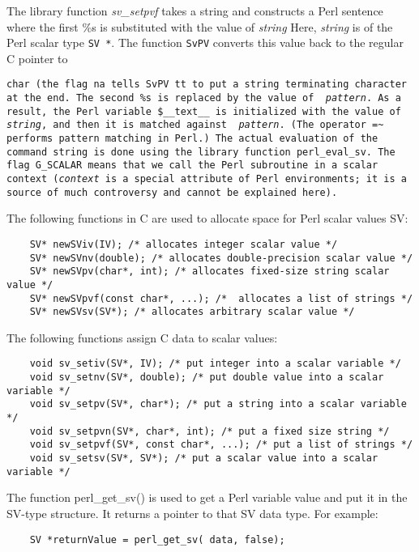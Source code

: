 \documentclass{article}
\begin{document}
The library function {\em sv\_setpvf\/} takes a string and constructs a
Perl sentence where the first \%s is substituted with the value of {\em
  string\/} Here, {\em string\/} is of the Perl scalar type \verb|SV *|.
The function {\tt SvPV} converts this value back to the regular C pointer
to {\tt char (the flag {\tt na} tells SvPV tt to put a string terminating
  character at the end. The second \%s is replaced by the value of {\em
    pattern}.  As a result, the Perl variable \$\_\_text\_\_ is initialized
  with the value of {\em string\/}, and then it is matched against {\em
    pattern}. (The operator \verb|=~| performs pattern matching in Perl.)
  The actual evaluation of the command string is done using the library
  function {\tt perl\_eval\_sv}.  The flag {G\_SCALAR} means that we call
  the Perl subroutine in a scalar context ({\em context\/} is a special
  attribute of Perl environments; it is a source of much controversy and
  cannot be explained here).


  
\noindent
The following functions in C are used to allocate space for Perl scalar
values SV:

\begin{verbatim}
    SV* newSViv(IV); /* allocates integer scalar value */
    SV* newSVnv(double); /* allocates double-precision scalar value */
    SV* newSVpv(char*, int); /* allocates fixed-size string scalar value */
    SV* newSVpvf(const char*, ...); /*  allocates a list of strings */
    SV* newSVsv(SV*); /* allocates arbitrary scalar value */
\end{verbatim}


\noindent
The following functions assign C data to scalar values:

\begin{verbatim}
    void sv_setiv(SV*, IV); /* put integer into a scalar variable */
    void sv_setnv(SV*, double); /* put double value into a scalar variable */
    void sv_setpv(SV*, char*); /* put a string into a scalar variable */
    void sv_setpvn(SV*, char*, int); /* put a fixed size string */
    void sv_setpvf(SV*, const char*, ...); /* put a list of strings */
    void sv_setsv(SV*, SV*); /* put a scalar value into a scalar variable */
\end{verbatim}


The function
perl{\_}get{\_}sv() is used to get a Perl variable value and put it in the
SV-type structure. It returns a pointer to that SV data type. For
example:

\begin{verbatim}
    SV *returnValue = perl_get_sv( data, false);
\end{verbatim}

}
\end{document}
